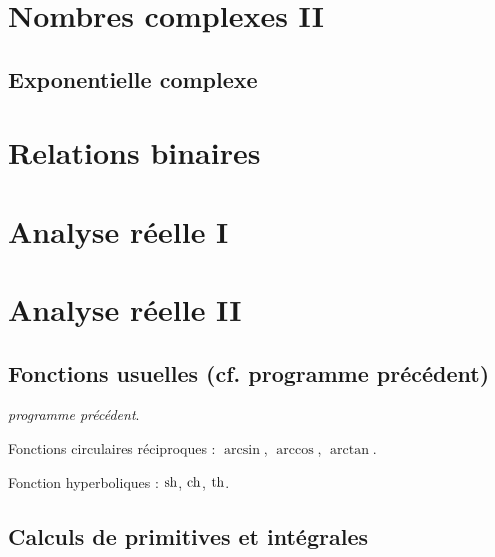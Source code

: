 \documentclass[a4paper,french,bookmarks]{book}
\begin{document}
    \cleardoublepage
    \def\khdate{du 11 au 15 octobre 2021}
    \chapter{Nombres complexes II}
    
    \section*{Exponentielle complexe}
    
    \def\khdate{du 18 au 22 octobre 2021}
    \chapter{Relations binaires}
    
    \def\khdate{du 15 au 19 novembre 2021}
    \chapter{Analyse réelle I}
    
    \def\khdate{du 22 au 26 novembre 2021}
    \chapter{Analyse réelle II}
    
    \section*{Fonctions usuelles (cf. programme précédent)}

    \begin{enumerate}
        \ithand \textit{\cf programme précédent}.
    
        \ithand Fonctions circulaires réciproques : $\arcsin$, $\arccos$, $\arctan$.
    
        \ithand Fonction hyperboliques : $\sh$, $\ch$, $\th$.
    \end{enumerate}

    \section*{Calculs de primitives et intégrales}
\end{document}

